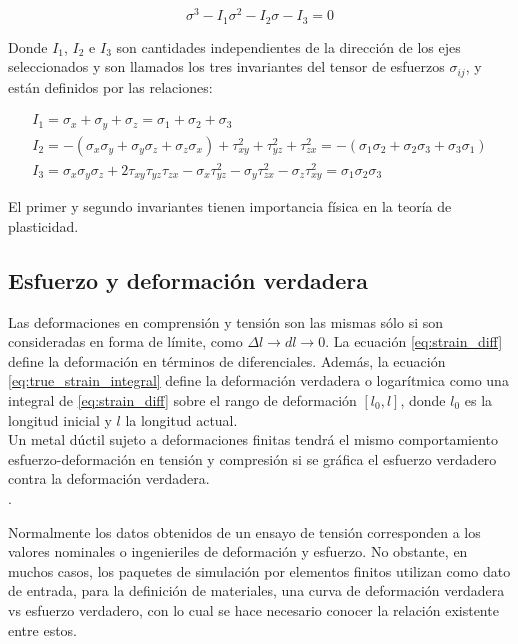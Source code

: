 \begin{equation}
\sigma^3 - I_1 \sigma^2 - I_2 \sigma - I_3 = 0
\end{equation}

Donde $I_1$, $I_2$ e $I_3$ son cantidades independientes de la dirección de los ejes 
seleccionados y son llamados los tres invariantes del tensor de esfuerzos $\sigma_{ij}$, y están definidos 
por las relaciones:

\begin{align}
I_1 = \sigma_x + \sigma_y + \sigma_z = \sigma_1 + \sigma_2 + \sigma_3 \\
I_2 = -\left( \sigma_x \sigma_y + \sigma_y \sigma_z + \sigma_z \sigma_x \right) + \tau_{xy}^2 + 
\tau_{yz}^2 + \tau_{zx}^2 = -(\sigma_1 \sigma_2 + \sigma_2 \sigma_3 + \sigma_3 \sigma_1) \\
I_3 = \sigma_x \sigma_y \sigma_z + 2 \tau_{xy} \tau_{yz} \tau_{zx} - \sigma_x \tau_{yz}^2 - \sigma_y \tau_{zx}^2 - 
\sigma_z \tau_{xy}^2 = \sigma_1 \sigma_2 \sigma_3
\end{align}

El primer y segundo invariantes tienen importancia física en la teoría de plasticidad.\\


\subsection{Esfuerzo y deformación verdadera}

Las deformaciones en comprensión y tensión son las mismas sólo si son consideradas 
en forma de límite, como $\Delta l \to dl  \to 0$. La ecuación \ref{eq:strain_diff} 
define la deformación en términos de diferenciales. Además, la ecuación 
\ref{eq:true_strain_integral} define la deformación verdadera o logarítmica como una integral 
de \ref{eq:strain_diff} sobre el rango de deformación $[l_0, l]$, donde 
$l_0$ es la longitud inicial y $l$ la longitud actual.\\

Un metal dúctil sujeto a deformaciones finitas tendrá el mismo comportamiento esfuerzo-deformación 
en tensión y compresión si se gráfica el esfuerzo verdadero contra la deformación verdadera.
~\cite{abaqus-gs-manual} \\.

Normalmente los datos obtenidos de un ensayo de tensión corresponden a los valores nominales 
o ingenieriles de deformación y esfuerzo. No obstante, en muchos casos, los paquetes de simulación por 
elementos finitos utilizan como dato de entrada, para la definición de materiales, una curva de 
deformación verdadera vs esfuerzo verdadero, con lo cual se hace necesario conocer la 
relación existente entre estos.\\

